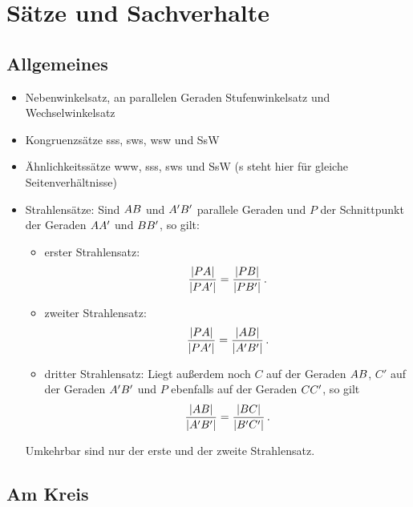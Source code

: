 \documentclass[11pt,a4paper]{article}
\begin{document}
\section{Sätze und Sachverhalte}

\subsection{Allgemeines}

\begin{itemize}
\item Nebenwinkelsatz, an parallelen Geraden Stufenwinkelsatz und
  Wechselwinkelsatz
\item Kongruenzsätze sss, sws, wsw und SsW
\item Ähnlichkeitssätze www, sss, sws und SsW (s steht hier für gleiche
  Seitenverhältnisse)
\item Strahlensätze: Sind ${\mathnormal{AB}}$ und ${\mathnormal{A'B'}}$ parallele Geraden
  und $P$ der Schnittpunkt der Geraden ${\mathnormal{AA'}}$ und ${\mathnormal{BB'}}$, so
  gilt:
\begin{itemize}
\item erster Strahlensatz:
  \begin{gather*}
    \frac{\left\vert {\mathnormal{PA}}\right\vert}{\left\vert {\mathnormal{PA'}}\right\vert}
    =\frac{\left\vert {\mathnormal{PB}}\right\vert}{\left\vert {\mathnormal{PB'}}\right\vert}\,.
  \end{gather*}
\item zweiter Strahlensatz:
  \begin{gather*}
    \frac{\left\vert {\mathnormal{PA}}\right\vert}{\left\vert {\mathnormal{PA'}}\right\vert}
    =\frac{\left\vert {\mathnormal{AB}}\right\vert}{\left\vert {\mathnormal{A'B'}}\right\vert}\,.
  \end{gather*}
\item dritter Strahlensatz: Liegt außerdem noch $C$ auf der Geraden
  ${\mathnormal{AB}}$, $C'$ auf der Geraden ${\mathnormal{A'B'}}$ und $P$ ebenfalls auf der
  Geraden ${\mathnormal{CC'}}$, so gilt
  \begin{gather*}    
    \frac{\left\vert {\mathnormal{AB}}\right\vert}{\left\vert {\mathnormal{A'B'}}\right\vert}
    =\frac{\left\vert {\mathnormal{BC}}\right\vert}{\left\vert {\mathnormal{B'C'}}\right\vert}\,. 
  \end{gather*}
\end{itemize}
Umkehrbar sind nur der erste und der zweite Strahlensatz.
\end{itemize}

\subsection{Am Kreis}
\end{document}
